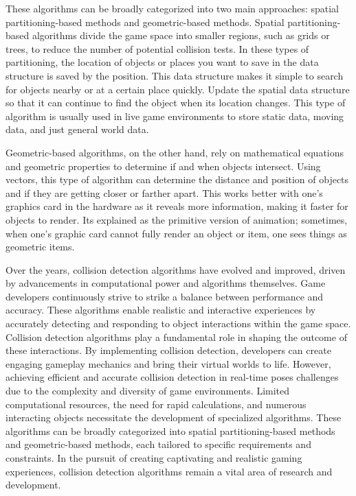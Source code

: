 \documentclass{article}
\theoremstyle{theorem}
\theoremstyle{definition}
\theoremstyle{remark}
\begin{document}
\medskip\indent
These algorithms can be broadly categorized into two main approaches: spatial partitioning-based methods and geometric-based methods. Spatial partitioning-based algorithms divide the game space into smaller regions, such as grids or trees, to reduce the number of potential collision tests. In these types of partitioning, the location of objects or places you want to save in the data structure is saved by the position. This data structure makes it simple to search for objects nearby or at a certain place quickly. Update the spatial data structure so that it can continue to find the object when its location changes\cite{Spa}. This type of algorithm is usually used in live game environments to store static data, moving data, and just general world data.

\medskip\indent
Geometric-based algorithms, on the other hand, rely on mathematical equations and geometric properties to determine if and when objects intersect. Using vectors, this type of algorithm can determine the distance and position of objects and if they are getting closer or farther apart. This works better with one’s graphics card in the hardware as it reveals more information, making it faster for objects to render.\cite{Dvg} Its explained as the primitive version of animation; sometimes, when one's graphic card cannot fully render an object or item, one sees things as geometric items.

\medskip\indent
Over the years, collision detection algorithms have evolved and improved, driven by advancements in computational power and algorithms themselves. Game developers continuously strive to strike a balance between performance and accuracy. These algorithms enable realistic and interactive experiences by accurately detecting and responding to object interactions within the game space. Collision detection algorithms play a fundamental role in shaping the outcome of these interactions. By implementing collision detection, developers can create engaging gameplay mechanics and bring their virtual worlds to life. However, achieving efficient and accurate collision detection in real-time poses challenges due to the complexity and diversity of game environments. Limited computational resources, the need for rapid calculations, and numerous interacting objects necessitate the development of specialized algorithms. These algorithms can be broadly categorized into spatial partitioning-based methods and geometric-based methods, each tailored to specific requirements and constraints. In the pursuit of creating captivating and realistic gaming experiences, collision detection algorithms remain a vital area of research and development.
\end{document}
